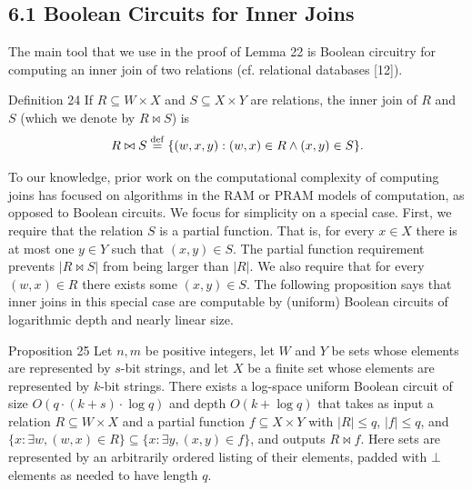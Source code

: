 \subsection*{6.1 Boolean Circuits for Inner Joins}
The main tool that we use in the proof of Lemma 22 is Boolean circuitry for computing an inner join of two relations (cf. relational databases [12]).
\begin{originalresult}{Definition 24}
If $R\subseteq W\times X$ and $S\subseteq X\times Y$ are relations, the inner join of $R$ and $S$ (which we denote by $R\bowtie S$) is
\[R\bowtie S\stackrel{\rm def}=\{(w,x,y):(w,x)\in R\land(x,y)\in S\}.\]
\end{originalresult}
To our knowledge, prior work on the computational complexity of computing joins has focused on algorithms in the RAM or PRAM models of computation, as opposed to Boolean circuits.
We focus for simplicity on a special case. First, we require that the relation $S$ is a partial function. That is, for every $x\in X$ there is at most one $y\in Y$ such that $(x,y)\in S$. The partial function requirement prevents $|R\bowtie S|$ from being larger than $|R|$. We also require that for every $(w,x)\in R$ there exists some $(x,y)\in S$.
The following proposition says that inner joins in this special case are computable by (uniform) Boolean circuits of logarithmic depth and nearly linear size.
\begin{originalresult}{Proposition 25}
Let $n,m$ be positive integers, let $W$ and $Y$ be sets whose elements are represented by $s$-bit strings, and let $X$ be a finite set whose elements are represented by $k$-bit strings.
There exists a log-space uniform Boolean circuit of size $O(q\cdot(k+s)\cdot\log q)$ and depth $O(k+\log q)$ that takes as input a relation $R\subseteq W\times X$ and a partial function $f\subseteq X\times Y$ with $|R|\le q$, $|f|\le q$, and $\{x:\exists w,(w,x)\in R\}\subseteq\{x:\exists y,(x,y)\in f\}$, and outputs $R\bowtie f$.
Here sets are represented by an arbitrarily ordered listing of their elements, padded with $\bot$ elements as needed to have length $q$.
\end{originalresult}
